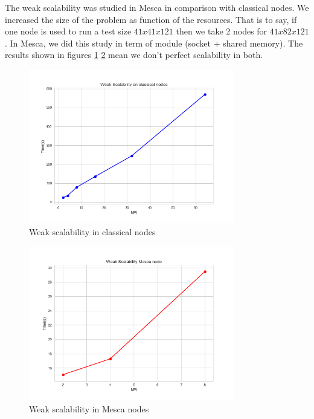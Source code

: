 The weak scalability was studied in Mesca in comparison with classical nodes. We increased the size of the problem as function of the resources. That is to say, if one node is used to run a test size $41x41x121$ then we take 2 nodes for $41x82x121$. In Mesca, we did this study in term of module (socket + shared memory). The results shown in figures \ref{weakScaleNodes} \ref{weakScaleMesca} mean we don't perfect scalability in both.

\begin{figure}[!h]
\centering 
\includegraphics[width=0.8\textwidth]{images/weakScaleNodes.png}
\caption{Weak scalability in classical nodes}
\label{weakScaleNodes} 
\end{figure}
\begin{figure}[!h]
\centering 
\includegraphics[width=0.8\textwidth]{images/weakScaleMesca.png}
\caption{Weak scalability in Mesca nodes}
\label{weakScaleMesca} 
\end{figure}
